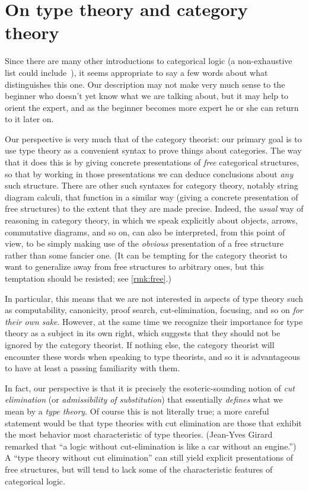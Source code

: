 \section{On type theory and category theory}
\label{sec:generalities}

Since there are many other introductions to categorical logic (a non-exhaustive list could include~\cite{mr:focl,ls:hocl,jacobs:cltt,goldblatt:topoi,ptj:elephant}), it seems appropriate to say a few words about what distinguishes this one.
Our description may not make very much sense to the beginner who doesn't yet know what we are talking about, but it may help to orient the expert, and as the beginner becomes more expert he or she can return to it later on.

Our perspective is very much that of the category theorist: our primary goal is to use type theory as a convenient syntax to prove things about categories.
The way that it does this is by giving concrete presentations of \emph{free} categorical structures, so that by working in those presentations we can deduce conclusions about \emph{any} such structure.
There are other such syntaxes for category theory, notably string diagram calculi, that function in a similar way (giving a concrete presentation of free structures) to the extent that they are made precise.
Indeed, the \emph{usual} way of reasoning in category theory, in which we speak explicitly about objects, arrows, commutative diagrams, and so on, can also be interpreted, from this point of view, to be simply making use of the \emph{obvious} presentation of a free structure rather than some fancier one.
(It can be tempting for the category theorist to want to generalize away from free structures to arbitrary ones, but this temptation should be resisted; see \cref{rmk:free}.)

In particular, this means that we are not interested in aspects of type theory such as computability, canonicity, proof search, cut-elimination, focusing, and so on \emph{for their own sake}.
However, at the same time we recognize their importance for type theory as a subject in its own right, which suggests that they should not be ignored by the category theorist.
If nothing else, the category theorist will encounter these words when speaking to type theorists, and so it is advantageous to have at least a passing familiarity with them.

In fact, our perspective is that it is precisely the esoteric-sounding notion of \emph{cut elimination} (or \emph{admissibility of substitution}) that essentially \emph{defines} what we mean by a \emph{type theory}.
Of course this is not literally true; a more careful statement would be that type theories with cut elimination are those that exhibit the most behavior most characteristic of type theories.
(Jean-Yves Girard remarked that ``a logic without cut-elimination is like a car without an engine.'')
A ``type theory without cut elimination'' can still yield explicit presentations of free structures, but will tend to lack some of the characteristic features of categorical logic.

